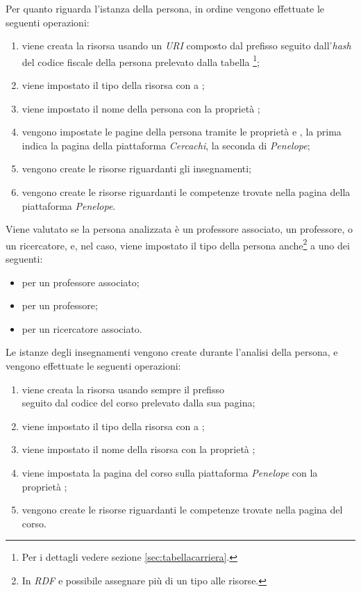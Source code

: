 \documentclass[tesi.tex]{subfiles}
\begin{document}
Per quanto riguarda l'istanza della persona, in ordine vengono
effettuate le seguenti operazioni:
\begin{enumerate}
\item viene creata la risorsa
  usando un \emph{URI} composto dal prefisso
   seguito dall'\emph{hash} del codice
  fiscale della persona prelevato dalla tabella
  \footnote{Per i dettagli vedere sezione
    \ref{sec:tabellacarriera}.};
\item viene impostato il tipo della risorsa con  a
  ;
\item  viene impostato il nome della persona con la
  propriet\`a ;
\item vengono impostate le pagine della persona tramite le propriet\`a
   e , la prima indica
  la pagina della piattaforma \emph{Cercachi}, la seconda di
  \emph{Penelope};
\item vengono create le risorse riguardanti gli insegnamenti;
\item vengono create le risorse riguardanti le competenze trovate
  nella pagina della piattaforma \emph{Penelope}.
\end{enumerate}
Viene valutato se la persona analizzata \`e un
professore associato, un professore, o un
ricercatore, e, nel caso, viene impostato il tipo della
persona anche\footnote{In \emph{RDF} e possibile assegnare pi\`u di un
  tipo alle risorse.} a uno dei seguenti:
\begin{itemize}
\item {} per un professore associato;
\item {} per un professore;
\item {} per un ricercatore associato.
\end{itemize}

Le istanze degli insegnamenti vengono create durante l'analisi della
persona, e vengono effettuate le seguenti operazioni:
\begin{enumerate}
\item viene creata la risorsa usando sempre il prefisso\\
   seguito dal codice del corso prelevato
  dalla sua pagina;
\item viene impostato il tipo della risorsa con  a
  ;
\item viene impostato il nome della risorsa con la propriet\`a
  ;
\item viene impostata la pagina del corso sulla piattaforma
  \emph{Penelope} con la propriet\`a ;
\item vengono create le risorse riguardanti le competenze trovate
  nella pagina del corso.
\end{enumerate}
\end{document}
